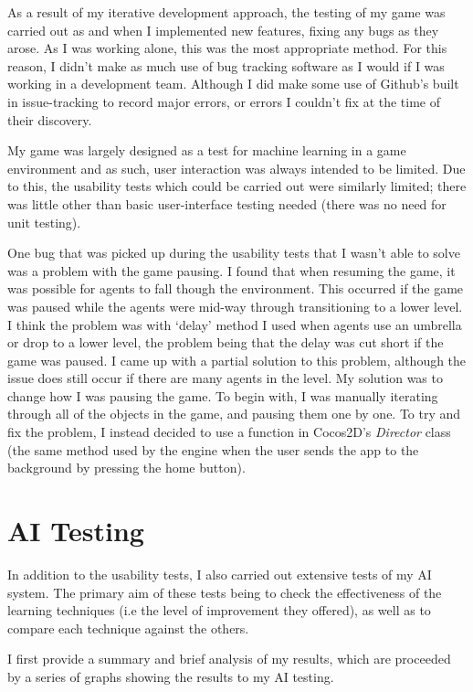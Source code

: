 \documentclass[a4paper,oneside]{report}
\begin{document}
As a result of my iterative development approach, the testing of my game was carried out as and when I implemented new features, fixing any bugs as they arose. As I was working alone, this was the most appropriate method. For this reason, I didn't make as much use of bug tracking software as I would if I was working in a development team. Although I did make some use of Github's built in issue-tracking to record major errors, or errors I couldn't fix at the time of their discovery.

My game was largely designed as a test for machine learning in a game environment and as such, user interaction was always intended to be limited. Due to this, the usability tests which could be carried out were similarly limited; there was little other than basic user-interface testing needed (there was no need for unit testing).

One bug that was picked up during the usability tests that I wasn't able to solve was a problem with the game pausing. I found that when resuming the game, it was possible for agents to fall though the environment. This occurred if the game was paused while the agents were mid-way through transitioning to a lower level. I think the problem was with `delay' method I used when agents use an umbrella or drop to a lower level, the problem being that the delay was cut short if the game was paused. I came up with a partial solution to this problem, although the issue does still occur if there are many agents in the level. My solution was to change how I was pausing the game. To begin with, I was manually iterating through all of the objects in the game, and pausing them one by one. To try and fix the problem, I instead decided to use a function in Cocos2D's \emph{Director} class (the same method used by the engine when the user sends the app to the background by pressing the home button).

\section{AI Testing}

In addition to the usability tests, I also carried out extensive tests of my AI system. The primary aim of these tests being to check the effectiveness of the learning techniques (i.e the level of improvement they offered), as well as to compare each technique against the others.

I first provide a summary and brief analysis of my results, which are proceeded by a series of graphs showing the results to my AI testing.
\end{document}
